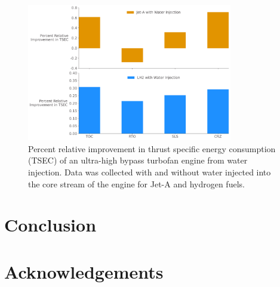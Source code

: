 \documentclass[conf]{new-aiaa}
\begin{document}
\begin{figure}[hbt!]
    \centering
    \includegraphics[width=0.8\textwidth]{JetA-H2_bar_chart_diff.pdf}
    \caption{Percent relative improvement in thrust specific energy consumption (TSEC) of an ultra-high bypass turbofan engine from water injection.
        Data was collected with and without water injected into the core stream of the engine for Jet-A and hydrogen fuels.}
    \label{fig:results}
\end{figure}


\section{Conclusion}
\label{sec:conc}

\section{Acknowledgements}


\end{document}
